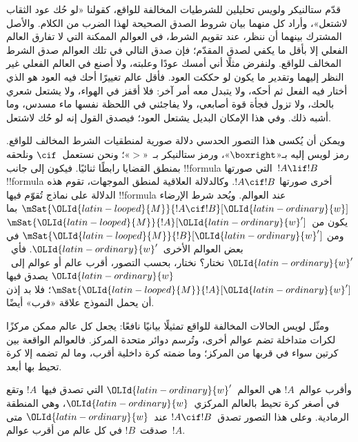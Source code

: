 \documentclass[../../../include/open-logic-section]{subfiles}
\begin{document}


قدّم ستالنيكر ولويس تحليلين للشرطيات المخالفة للواقع، كقولنا «لو حُك
عود الثقاب لاشتعل»، وأراد كل منهما بيان شروط الصدق الصحيحة لهذا الضرب
من الكلام. والأصل المشترك بينهما أن ننظر، عند تقويم الشرط، في العوالم
الممكنة التي لا تفارق العالم الفعلي إلا بأقل ما يكفي لصدق المقدّم؛ فإن
صدق التالي في تلك العوالم صدق الشرط المخالف للواقع. ولنفرض مثلًا أني
أمسك عودًا وعلبته، ولا أصنع في العالم الفعلي غير النظر إليهما وتقدير ما
يكون لو حككت العود. فأقل عالم تغييرًا أحك فيه العود هو الذي أختار فيه
الفعل ثم أحكه، ولا يتبدل معه أمر آخر: فلا أقفز في الهواء، ولا يشتعل
شعري بالحك، ولا تزول فجأة قوة أصابعي، ولا يفاجئني في اللحظة نفسها ماء
مسدس، وما أشبه ذلك. وفي هذا الإمكان البديل يشتعل العود؛ فيصدق القول إنه
لو حُك لاشتعل.

ويمكن أن يُكسى هذا التصور الحدسي دلالة صورية لمنطقيات الشرط المخالف
للواقع. رمز لويس إليه بـ«$\boxright$»، ورمز ستالنيكر بـ~«$>$»؛ ونحن
نستعمل~$\cif$ ونلحقه بمنطق القضايا رابطًا ثنائيًا. فيكون إلى جانب
!!{formula} التي صورتها~$!A \lif !B$ !!{formula} أخرى صورتها
$!A \cif !B$. وكالدلالة العلاقية لمنطق الموجهات، تقوم هذه الدلالة على
نماذج تُقوّم فيها !!{formula} عند العوالم. ويُحد شرط الإرضاء
$\mSat{\OLId{latin-looped}{M}}{!A \cif !B}[\OLId{latin-ordinary}{w}]$ بما يكون من~$\mSat{\OLId{latin-looped}{M}}{!A}[\OLId{latin-ordinary}{w}']$ ومن
$\mSat{\OLId{latin-looped}{M}}{!B}[\OLId{latin-ordinary}{w}']$ في بعض العوالم الأخرى~$\OLId{latin-ordinary}{w}'$. فأي~$\OLId{latin-ordinary}{w}'$ نختار؟ نختار،
بحسب التصور، أقرب عالم أو عوالم إلى~$\OLId{latin-ordinary}{w}$ يصدق فيها
$\mSat{\OLId{latin-looped}{M}}{!A}[\OLId{latin-ordinary}{w}']$؛ فلا بد إذن أن يحمل النموذج علاقة «قرب» أيضًا.

ومثّل لويس الحالات المخالفة للواقع تمثيلًا بيانيًا نافعًا: يجعل كل عالم
ممكن مركزًا لكرات متداخلة تضم عوالم أخرى، وتُرسم دوائر متحدة المركز.
فالعوالم الواقعة بين كرتين سواء في قربها من المركز؛ وما ضمته كرة داخلية
أقرب، وما لم تضمه إلا كرة تحيط بها أبعد.
\begin{center}
\end{center}
وأقرب عوالم~$!A$ هي العوالم~$\OLId{latin-ordinary}{w}'$ التي تصدق فيها~$!A$ وتقع في أصغر
كرة تحيط بالعالم المركزي~$\OLId{latin-ordinary}{w}$، وهي المنطقة الرمادية. وعلى هذا التصور
تصدق~$!A \cif !B$ عند~$\OLId{latin-ordinary}{w}$ متى صدقت~$!B$ في كل عالم من أقرب
عوالم~$!A$.
\end{document}
